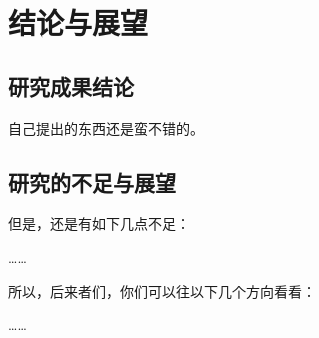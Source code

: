\chapter{结论与展望}


\section{研究成果结论}

自己提出的东西还是蛮不错的。

\section{研究的不足与展望}

但是，还是有如下几点不足：

……

所以，后来者们，你们可以往以下几个方向看看：

……